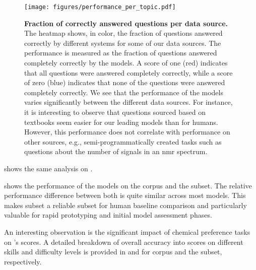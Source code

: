 \begin{figure}[htb]
    \centering
    \texttt{[image: figures/performance\_per\_topic.pdf]}
    \caption{\textbf{Fraction of correctly answered questions per data source.} The heatmap shows, in color, the fraction of questions answered correctly by different systems for some of our data sources. The performance is measured as the fraction of questions answered completely correctly by the models. A score of one (red) indicates that all questions were answered completely correctly, while a score of zero (blue) indicates that none of the questions were answered completely correctly.
        We see that the performance of the models varies significantly between the different data sources. For instance, it is interesting to observe that questions sourced based on textbooks seem easier for our leading models than for humans. However, this performance does not correlate with performance on other sources, e.g., semi-programmatically created tasks such as questions about the number of signals in an \gls{nmr} spectrum.
    }
    \label{fig:performance_per_topic}
\end{figure}

 shows the same analysis on \chembenchmini.

 shows the performance of the models on the \chembench corpus and the \chembenchmini subset. The relative performance difference between both is quite similar across most models. 
This makes \chembenchmini subset a reliable subset for human baseline comparison and particularly valuable for rapid prototyping and initial model assessment phases. 

An interesting observation is the significant impact of chemical preference tasks on \GPTFour's scores. A detailed breakdown of overall accuracy into scores on different skills and difficulty levels is provided in  and  for \chembench corpus and the \chembenchmini subset, respectively.


